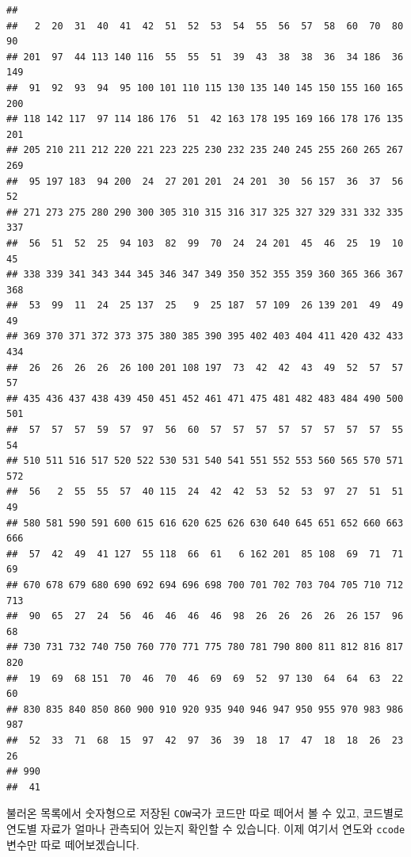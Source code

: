 \documentclass[]{book}
\newenvironment{Shaded}{\begin{snugshade}}{\end{snugshade}}
\newcommand{\CommentTok}[1]{\textcolor[rgb]{0.56,0.35,0.01}{\textit{#1}}}
\newcommand{\KeywordTok}[1]{\textcolor[rgb]{0.13,0.29,0.53}{\textbf{#1}}}
\newcommand{\NormalTok}[1]{#1}
\newcommand{\OperatorTok}[1]{\textcolor[rgb]{0.81,0.36,0.00}{\textbf{#1}}}
\begin{document}
\begin{Shaded}
\end{Shaded}

\begin{verbatim}
## 
##   2  20  31  40  41  42  51  52  53  54  55  56  57  58  60  70  80  90 
## 201  97  44 113 140 116  55  55  51  39  43  38  38  36  34 186  36 149 
##  91  92  93  94  95 100 101 110 115 130 135 140 145 150 155 160 165 200 
## 118 142 117  97 114 186 176  51  42 163 178 195 169 166 178 176 135 201 
## 205 210 211 212 220 221 223 225 230 232 235 240 245 255 260 265 267 269 
##  95 197 183  94 200  24  27 201 201  24 201  30  56 157  36  37  56  52 
## 271 273 275 280 290 300 305 310 315 316 317 325 327 329 331 332 335 337 
##  56  51  52  25  94 103  82  99  70  24  24 201  45  46  25  19  10  45 
## 338 339 341 343 344 345 346 347 349 350 352 355 359 360 365 366 367 368 
##  53  99  11  24  25 137  25   9  25 187  57 109  26 139 201  49  49  49 
## 369 370 371 372 373 375 380 385 390 395 402 403 404 411 420 432 433 434 
##  26  26  26  26  26 100 201 108 197  73  42  42  43  49  52  57  57  57 
## 435 436 437 438 439 450 451 452 461 471 475 481 482 483 484 490 500 501 
##  57  57  57  59  57  97  56  60  57  57  57  57  57  57  57  57  55  54 
## 510 511 516 517 520 522 530 531 540 541 551 552 553 560 565 570 571 572 
##  56   2  55  55  57  40 115  24  42  42  53  52  53  97  27  51  51  49 
## 580 581 590 591 600 615 616 620 625 626 630 640 645 651 652 660 663 666 
##  57  42  49  41 127  55 118  66  61   6 162 201  85 108  69  71  71  69 
## 670 678 679 680 690 692 694 696 698 700 701 702 703 704 705 710 712 713 
##  90  65  27  24  56  46  46  46  46  98  26  26  26  26  26 157  96  68 
## 730 731 732 740 750 760 770 771 775 780 781 790 800 811 812 816 817 820 
##  19  69  68 151  70  46  70  46  69  69  52  97 130  64  64  63  22  60 
## 830 835 840 850 860 900 910 920 935 940 946 947 950 955 970 983 986 987 
##  52  33  71  68  15  97  42  97  36  39  18  17  47  18  18  26  23  26 
## 990 
##  41
\end{verbatim}

불러온 목록에서 숫자형으로 저장된 \texttt{COW}국가 코드만 따로 떼어서 볼 수 있고, 코드별로 연도별 자료가 얼마나 관측되어 있는지 확인할 수 있습니다. 이제 여기서 연도와 \texttt{ccode} 변수만 따로 떼어보겠습니다.
\end{document}
